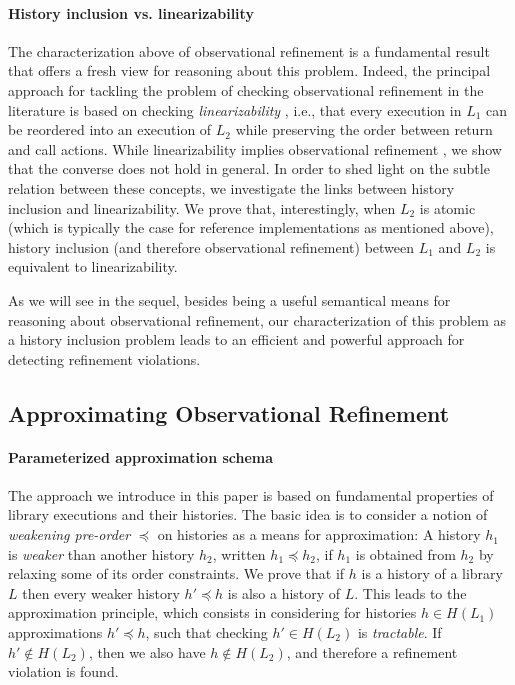 \paragraph{History inclusion vs. linearizability}

The characterization above of observational refinement is a fundamental result
that offers a fresh view for reasoning about this problem. Indeed, the
principal approach for tackling the problem of checking observational refinement
in the literature is based on checking \emph{linearizability} \cite{}, i.e.,
that every execution in $L_1$ can be reordered into an execution of $L_2$ while
preserving the order between return and call actions. While linearizability
implies observational refinement \cite{}, we show that the converse does not
hold in general. In order to shed light on the subtle relation between these
concepts, we investigate the links between history inclusion and
linearizability. We prove that, interestingly, when $L_2$ is atomic (which is
typically the case for reference implementations as mentioned above), history
inclusion (and therefore observational refinement) between $L_1$ and $L_2$ is
equivalent to linearizability.

As we will see in the sequel, besides being a useful semantical means for
reasoning about observational refinement, our characterization of this problem
as a history inclusion problem leads to an efficient and powerful approach for
detecting refinement violations.


\subsection{Approximating Observational Refinement}
\label{sec:intro:approx}

\paragraph{Parameterized approximation schema}

The approach we introduce in this paper is based on fundamental properties of
library executions and their histories. The basic idea is to consider a notion
of \emph{weakening pre-order} $\preceq$ on histories as a means for
approximation: A history $h_1$ is \emph{weaker} than another history $h_2$,
written $h_1 \preceq h_2$, if $h_1$ is obtained from $h_2$ by relaxing some of
its order constraints. We prove that if $h$ is a history of a library $L$ then 
every weaker history $h'\preceq h$ is also a history of $L$. This leads to the approximation principle, 
which consists in considering for histories $h\in H(L_1)$ approximations $h' \preceq h$, such that checking 
$h' \in H(L_2)$ is \emph{tractable}. If $h' \not\in H(L_2)$, then we also have $h \not\in
H(L_2)$, and therefore a refinement violation is found.

